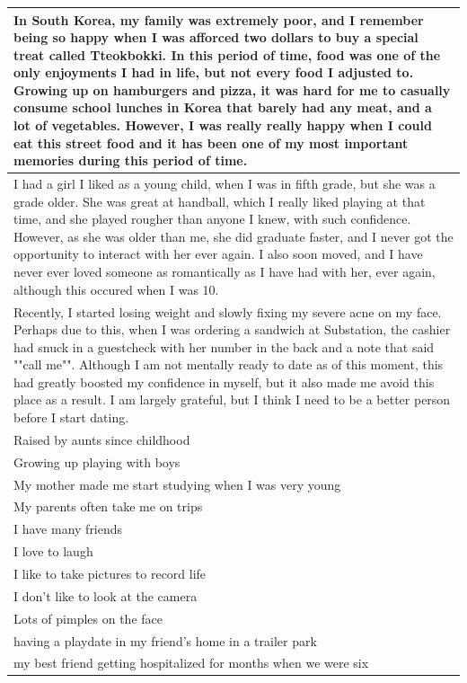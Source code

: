 \documentclass[
  .7em,
  letterpaper,
  DIV=11,
  numbers=noendperiod]{scrartcl}
\begin{document}
\begin{table}
\begin{tabular}{l}
\hline
In South Korea, my family was extremely poor, and I remember being so happy when I was afforced two dollars to buy a special treat called Tteokbokki. In this period of time, food was one of the only enjoyments I had in life, but not every food I adjusted to. Growing up on hamburgers and pizza, it was hard for me to casually consume school lunches in Korea that barely had any meat, and a lot of vegetables. However, I was really really happy when I could eat this street food and it has been one of my most important memories during this period of time.\\
\hline
I had a girl I liked as a young child, when I was in fifth grade, but she was a grade older. She was great at handball, which I really liked playing at that time, and she played rougher than anyone I knew, with such confidence. However, as she was older than me, she did graduate faster, and I never got the opportunity to interact with her ever again. I also soon moved, and I have never ever loved someone as romantically as I have had with her, ever again, although this occured when I was 10.\\
\hline
Recently, I started losing weight and slowly fixing my severe acne on my face. Perhaps due to this, when I was ordering a sandwich at Substation, the cashier had snuck in a guestcheck with her number in the back and a note that said ""call me"". Although I am not mentally ready to date as of this moment, this had greatly boosted my confidence in myself, but it also made me avoid this place as a result. I am largely grateful, but I think I need to be a better person before I start dating.\\
\hline
Raised by aunts since childhood\\
\hline
Growing up playing with boys\\
\hline
My mother made me start studying when I was very young\\
\hline
My parents often take me on trips\\
\hline
I have many friends\\
\hline
I love to laugh\\
\hline
I like to take pictures to record life\\
\hline
I don't like to look at the camera\\
\hline
Lots of pimples on the face\\
\hline
having a playdate in my friend's home in a trailer park\\
\hline
my best friend getting hospitalized for months when we were six\\

\end{tabular}
\end{table}
\end{document}
